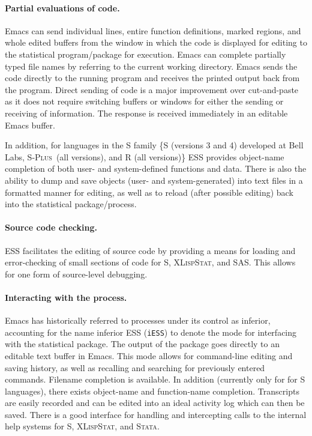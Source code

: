 \documentclass{article}
\newcommand*{\Splus}{\textsc{S-Plus}}
\newcommand*{\XLispStat}{\textsc{XLispStat}}
\newcommand*{\Stata}{\textsc{Stata}}
\newcommand{\stexttt}[1]{{\small\texttt{#1}}}
\begin{document}
\paragraph{Partial evaluations of code.}
Emacs can send individual lines, entire function definitions, marked
regions, and whole edited buffers from the window in which the code is
displayed for editing to the statistical program/package for
execution.  Emacs can complete partially typed file
names by referring to the current working directory.
Emacs sends the code directly to the running program and
receives the printed output back from the program.  Direct sending of
code is a major improvement over cut-and-paste as it does not require
switching buffers or windows for either the sending or receiving of
information.  The response is received immediately in an editable Emacs buffer.


In addition, for languages in the S family \{S
(versions 3 and 4) developed at Bell Labs, \Splus\ (all versions), and
R (all versions)\} ESS provides object-name completion of both user- and
system-defined functions and data.  There is also the ability to dump
and save objects (user- and system-generated) into text files in a
formatted manner for editing, as well as to reload (after possible
editing) back into the statistical package/process.

\paragraph{Source code checking.}
ESS facilitates the editing of source code by providing a means
for loading and error-checking of small sections of code for S,
\XLispStat, and SAS.  This allows for one form of source-level
debugging.

\paragraph{Interacting with the process.}
Emacs has historically referred to processes under its control as
inferior, accounting for the name inferior ESS (\stexttt{iESS}) to
denote the mode for interfacing with the statistical package.  
The output of the package goes directly to an editable text buffer in Emacs.
This
mode allows for command-line editing and saving history, as well as
recalling and searching for previously entered commands.
Filename completion is available.    In addition (currently only for for S
languages), there exists object-name and function-name completion.
Transcripts are easily recorded and can be edited into an ideal
activity log which can then be saved.  There is a good interface for
handling and intercepting calls to the internal help systems for S,
\XLispStat, and \Stata.
\end{document}
